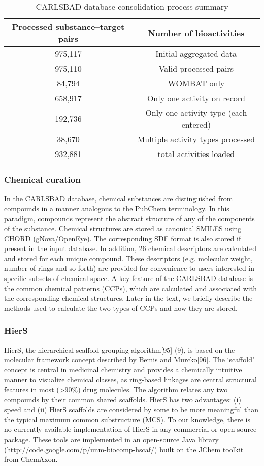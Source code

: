 \begin{table}[]
\centering
\begin{tabular}{c|c}
\hline
\textbf{Processed substance–target pairs} & \textbf{Number of bioactivities} \\
\hline
975,117 &	Initial aggregated data   \\
975,110 &	Valid processed pairs   \\
84,794 &	WOMBAT only   \\
658,917 &	Only one activity on record  \\ 
192,736 &	Only one activity type (each entered)  \\ 
38,670 &	Multiple activity types processed   \\
932,881 &	total activities loaded   \\
\hline
\end{tabular}
\caption{CARLSBAD database consolidation process summary}
\label{tab:cb_01}
\end{table}

\subsubsection{Chemical curation}

In the CARLSBAD database, chemical substances are distinguished from compounds in a manner analogous to the PubChem terminology. In this paradigm, compounds represent the abstract structure of any of the components of the substance. Chemical structures are stored as canonical SMILES using CHORD (gNova/OpenEye). The corresponding SDF format is also stored if present in the input database. In addition, 26 chemical descriptors are calculated and stored for each unique compound. These descriptors (e.g. molecular weight, number of rings and so forth) are provided for convenience to users interested in specific subsets of chemical space. A key feature of the CARLSBAD database is the common chemical patterns (CCPs), which are calculated and associated with the corresponding chemical structures. Later in the text, we briefly describe the methods used to calculate the two types of CCPs and how they are stored.

\subsubsection{HierS}

HierS, the hierarchical scaffold grouping algorithm[95] (9), is based on the molecular framework concept described by Bemis and Murcko[96]. The ‘scaffold’ concept is central in medicinal chemistry and provides a chemically intuitive manner to visualize chemical classes, as ring-based linkages are central structural features in most (>90\%) drug molecules. The algorithm relates any two compounds by their common shared scaffolds. HierS has two advantages: (i) speed and (ii) HierS scaffolds are considered by some to be more meaningful than the typical maximum common substructure (MCS). To our knowledge, there is no currently available implementation of HierS in any commercial or open-source package. These tools are implemented in an open-source Java library (http://code.google.com/p/unm-biocomp-hscaf/) built on the JChem toolkit from ChemAxon.

